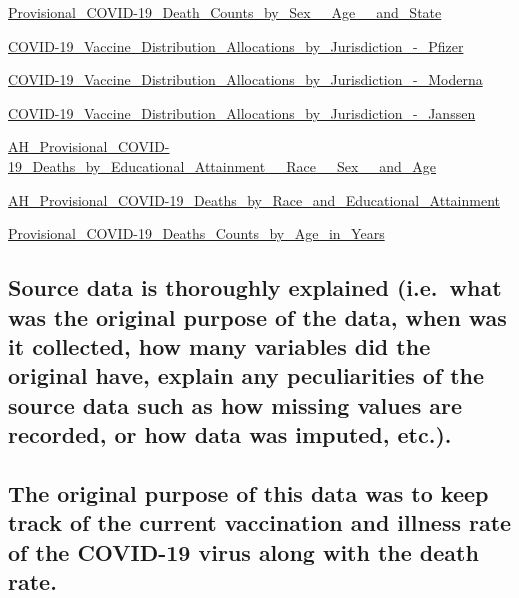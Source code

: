\documentclass[
]{article}
\begin{document}
\href{https://data.cdc.gov/NCHS/Provisional-COVID-19-Death-Counts-by-Sex-Age-and-S/9bhg-hcku}{Provisional\_COVID-19\_Death\_Counts\_by\_Sex\_\_Age\_\_and\_State}

\href{https://data.cdc.gov/Vaccinations/COVID-19-Vaccine-Distribution-Allocations-by-Juris/saz5-9hgg}{COVID-19\_Vaccine\_Distribution\_Allocations\_by\_Jurisdiction\_-\_Pfizer}

\href{https://data.cdc.gov/Vaccinations/COVID-19-Vaccine-Distribution-Allocations-by-Juris/b7pe-5nws}{COVID-19\_Vaccine\_Distribution\_Allocations\_by\_Jurisdiction\_-\_Moderna}

\href{https://data.cdc.gov/Vaccinations/COVID-19-Vaccine-Distribution-Allocations-by-Juris/w9zu-fywh}{COVID-19\_Vaccine\_Distribution\_Allocations\_by\_Jurisdiction\_-\_Janssen}

\href{https://data.cdc.gov/NCHS/AH-Provisional-COVID-19-Deaths-by-Educational-Atta/3ts8-hsrw}{AH\_Provisional\_COVID-19\_Deaths\_by\_Educational\_Attainment\_\_Race\_\_Sex\_\_and\_Age}

\href{https://data.cdc.gov/NCHS/AH-Provisional-COVID-19-Deaths-by-Race-and-Educati/i6ej-9eac}{AH\_Provisional\_COVID-19\_Deaths\_by\_Race\_and\_Educational\_Attainment}

\href{https://data.cdc.gov/NCHS/Provisional-COVID-19-Deaths-Counts-by-Age-in-Years/3apk-4u4f}{Provisional\_COVID-19\_Deaths\_Counts\_by\_Age\_in\_Years}

\hypertarget{source-data-is-thoroughly-explained-i.e.-what-was-the-original-purpose-of-the-data-when-was-it-collected-how-many-variables-did-the-original-have-explain-any-peculiarities-of-the-source-data-such-as-how-missing-values-are-recorded-or-how-data-was-imputed-etc..}{%
\subsection{Source data is thoroughly explained (i.e.~what was the
original purpose of the data, when was it collected, how many variables
did the original have, explain any peculiarities of the source data such
as how missing values are recorded, or how data was imputed,
etc.).}\label{source-data-is-thoroughly-explained-i.e.-what-was-the-original-purpose-of-the-data-when-was-it-collected-how-many-variables-did-the-original-have-explain-any-peculiarities-of-the-source-data-such-as-how-missing-values-are-recorded-or-how-data-was-imputed-etc..}}

\hypertarget{the-original-purpose-of-this-data-was-to-keep-track-of-the-current-vaccination-and-illness-rate-of-the-covid-19-virus-along-with-the-death-rate.}{%
\subsection{The original purpose of this data was to keep track of the
current vaccination and illness rate of the COVID-19 virus along with
the death
rate.}\label{the-original-purpose-of-this-data-was-to-keep-track-of-the-current-vaccination-and-illness-rate-of-the-covid-19-virus-along-with-the-death-rate.}}
\end{document}
